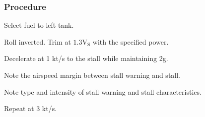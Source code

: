 % 
% 
%
 \subsubsection*{Procedure}
 \begin{compactenum}
   \item Select fuel to left tank.
   \item Roll inverted.  Trim at $\mathrm{1.3V_{S}}$ with the specified power.
   \item Decelerate at 1 kt/s to the stall while maintaining 2g.
   \item Note the airspeed margin between stall warning and stall.
   \item Note type and intensity of stall warning and stall characteristics.
   \item Repeat at 3 kt/s.
   \end{compactenum}